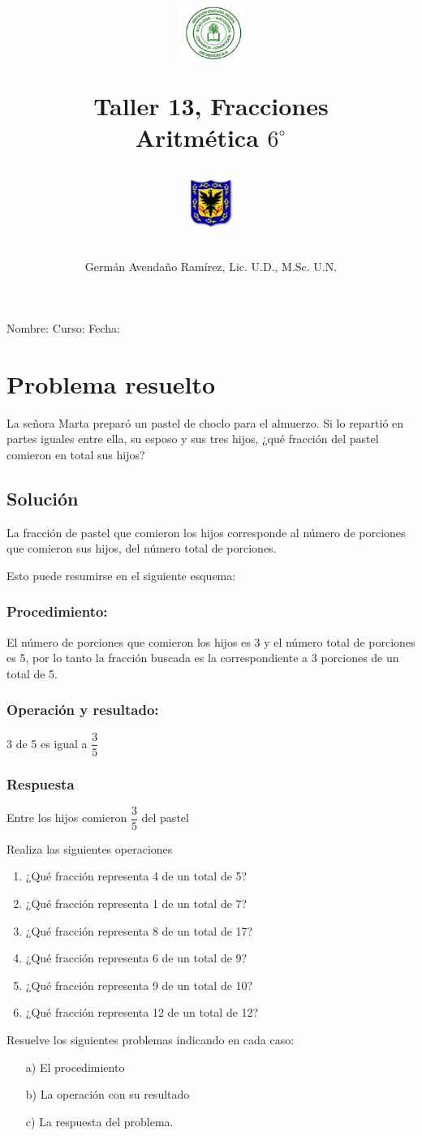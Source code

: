 \documentclass[10pt,twoside]{article}
\author{Germ\'an Avenda\~no Ram\'irez, Lic. U.D., M.Sc. U.N.}
\title{\begin{minipage}{.2\textwidth}
\includegraphics[height=1.75cm]{Images/logo-colegio.png}\end{minipage}
\begin{minipage}{.55\textwidth}
\begin{center}
Taller 13, Fracciones   \\
Aritmética $6^{\circ}$
\end{center}
\end{minipage}\hfill
\begin{minipage}{.2\textwidth}
\includegraphics[height=1.75cm]{Images/logo-sed.png} 
\end{minipage}}
\date{}
\begin{document}
\maketitle
Nombre: \hrulefill Curso: \underline{\hspace*{44pt}} Fecha: \underline{\hspace*{2.5cm}}
\section*{Problema resuelto}
La señora Marta preparó un pastel de choclo para el almuerzo. Si lo repartió en partes iguales entre ella, su esposo y sus tres hijos, ¿qué fracción del pastel comieron en total sus hijos?
\subsection*{Solución}
La fracción de pastel que comieron los hijos corresponde al número de porciones que
comieron sus hijos, del número total de porciones.

Esto puede resumirse en el siguiente esquema:
\subsubsection*{Procedimiento:}
El número de porciones que comieron los hijos es 3 y el número total de porciones es 5, por lo tanto la fracción buscada es la correspondiente a 3 porciones de un total de 5.
\subsubsection*{Operación y resultado:}
3 de 5 es igual a $\dfrac{3}{5}$
\subsubsection*{Respuesta}
Entre los hijos comieron $\dfrac{3}{5}$ del pastel

Realiza las siguientes operaciones
\begin{enumerate}
 \item  ¿Qué fracción representa 4 de un total de 5?
 \item ¿Qué fracción representa 1 de un total de 7? 
 \item ¿Qué fracción representa 8 de un total de 17?
 \item ¿Qué fracción representa 6 de un total de 9?
 \item ¿Qué fracción representa 9 de un total de 10?
 \item ¿Qué fracción representa 12 de un total de 12?
\end{enumerate}
Resuelve los siguientes problemas indicando en cada caso:
\begin{enumerate}
 \item[a)] El procedimiento
 \item[b)] La operación con su resultado
 \item[c)] La respuesta del problema.
\end{enumerate}
\end{document}
